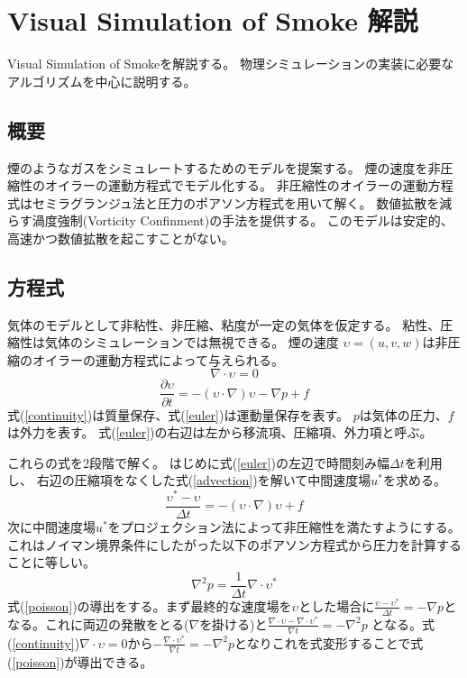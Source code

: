 \section{Visual Simulation of Smoke 解説}
Visual Simulation of Smoke\cite{Fedkiw2001}を解説する。
物理シミュレーションの実装に必要なアルゴリズムを中心に説明する。
\subsection{概要}
煙のようなガスをシミュレートするためのモデルを提案する。
煙の速度を非圧縮性のオイラーの運動方程式でモデル化する。
非圧縮性のオイラーの運動方程式はセミラグランジュ法と圧力のポアソン方程式を用いて解く。
数値拡散を減らす渦度強制(Vorticity Confinment)の手法を提供する。
このモデルは安定的、高速かつ数値拡散を起こすことがない。
\subsection{方程式}
気体のモデルとして非粘性、非圧縮、粘度が一定の気体を仮定する。
粘性、圧縮性は気体のシミュレーションでは無視できる。
煙の速度 $\upsilon = (u,v,w)$は非圧縮のオイラーの運動方程式によって与えられる。
\begin{equation}
\label{continuity}
\nabla \cdot \upsilon = 0
\end{equation}
\begin{equation}
\label{euler}
\frac{\partial \upsilon}{\partial t} = -(\upsilon \cdot \nabla)\upsilon - \nabla p + f
\end{equation}
式(\ref{continuity})は質量保存、式(\ref{euler})は運動量保存を表す。
$p$は気体の圧力、$f$は外力を表す。
式(\ref{euler})の右辺は左から移流項、圧縮項、外力項と呼ぶ。

これらの式を2段階で解く。
はじめに式(\ref{euler})の左辺で時間刻み幅$\Delta t$を利用し、
右辺の圧縮項をなくした式(\ref{advection})を解いて中間速度場$u^*$を求める。
\begin{equation}
\label{advection}
\frac{\upsilon^* - \upsilon}{\Delta t} = -(\upsilon \cdot \nabla)\upsilon + f
\end{equation}
次に中間速度場$u^*$をプロジェクション法によって非圧縮性を満たすようにする。
これはノイマン境界条件にしたがった以下のポアソン方程式から圧力を計算することに等しい。
\begin{equation}
\label{poisson}
\nabla^2 p = \frac{1}{\Delta t} \nabla \cdot \upsilon^*
\end{equation}
式(\ref{poisson})の導出をする。まず最終的な速度場を$\upsilon$とした場合に$\frac{\upsilon - \upsilon^* }{\Delta t} = - \nabla p$となる。これに両辺の発散をとる($\nabla$を掛ける)と$\frac{\nabla \cdot \upsilon - \nabla \cdot \upsilon^*}{\nabla t} = - \nabla^2 p$ となる。式(\ref{continuity})$\nabla \cdot \upsilon = 0$から$- \frac{\nabla \cdot \upsilon^*}{\nabla t} = - \nabla^2 p$となりこれを式変形することで式(\ref{poisson})が導出できる。

